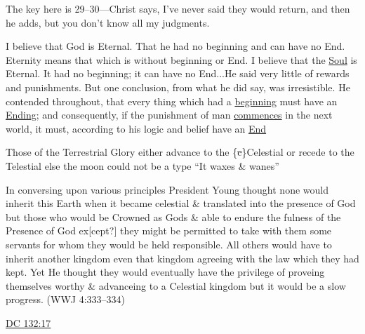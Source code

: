 		\begin{compactdesc}
			\item[{\hyperref[DC19-1]{DC 19:1--12}}]
			\item[{\hyperref[DC29-27]{DC 29:27--30}}]
				\begin{compactitem}
					\item The key here is 29--30---Christ says, I've never said they would return, and then he adds, but you don't know all my judgments.
				\end{compactitem}
			\item[{\hyperref[EMS-1840-JS-5-FEB-1840]{Joseph Smith, 5 February 1840}}] I believe that God is Eternal. That he had no beginning and can have no End. Eternity means that which is without beginning or End. I believe that the \uline{Soul} is Eternal. It had no beginning; it can have no End...He said very little of rewards and punishments. But one conclusion, from what he did say, was irresistible. He contended throughout, that every thing which had a \uline{beginning} must have an \uline{Ending}; and consequently, if the punishment of man \uline{commences} in the next world, it must, according to his logic and belief have an \uline{End}
			\item[{\hyperref[EMS-1843-HS-1-AUG-1843]{Hyrum Smith, 1 August 1843}}] Those of the Terrestrial Glory either advance to the \{\sout{c}\}Celestial or recede to the Telestial else the moon could not be a type ``It waxes \& wanes''
			\item[Brigham Young, 5 August 1855] In conversing upon various principles President Young thought none would inherit this Earth when it became celestial \& translated into the presence of God but those who would be Crowned as Gods \& able to endure the fulness of the Presence of God ex[cept?] they might be permitted to take with them some servants for whom they would be held responsible. All others would have to inherit another kingdom even that kingdom agreeing with the law which they had kept. Yet He thought they would eventually have the privilege of proveing themselves worthy \& advanceing to a Celestial kingdom but it would be a slow progress. (WWJ 4:333--334)
			\item[Against progression between kingdoms]
				\begin{compactitem}
					\item \hyperref[DC132-17]{DC 132:17}
				\end{compactitem}
		\end{compactdesc}